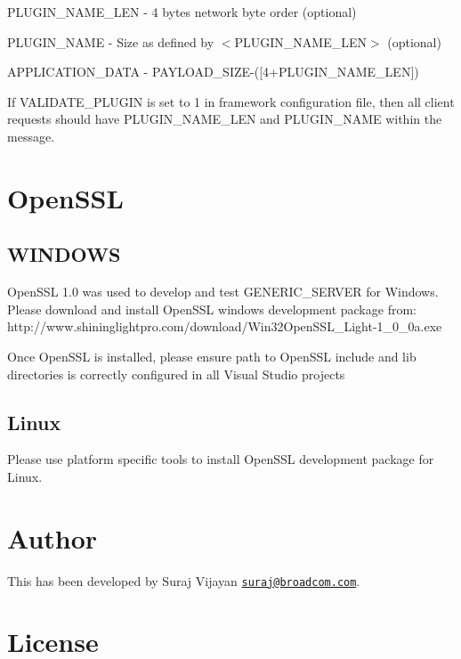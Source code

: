 \begin{DoxyItemize}
\item P\-L\-U\-G\-I\-N\-\_\-\-N\-A\-M\-E\-\_\-\-L\-E\-N -\/ 4 bytes network byte order (optional) \item P\-L\-U\-G\-I\-N\-\_\-\-N\-A\-M\-E -\/ Size as defined by $<$\-P\-L\-U\-G\-I\-N\-\_\-\-N\-A\-M\-E\-\_\-\-L\-E\-N$>$ (optional) \item A\-P\-P\-L\-I\-C\-A\-T\-I\-O\-N\-\_\-\-D\-A\-T\-A -\/ P\-A\-Y\-L\-O\-A\-D\-\_\-\-S\-I\-Z\-E-\/(\mbox{[}4+\-P\-L\-U\-G\-I\-N\-\_\-\-N\-A\-M\-E\-\_\-\-L\-E\-N\mbox{]})\end{DoxyItemize}
If V\-A\-L\-I\-D\-A\-T\-E\-\_\-\-P\-L\-U\-G\-I\-N is set to 1 in framework configuration file, then all client requests should have P\-L\-U\-G\-I\-N\-\_\-\-N\-A\-M\-E\-\_\-\-L\-E\-N and P\-L\-U\-G\-I\-N\-\_\-\-N\-A\-M\-E within the message.\hypertarget{index_ssl}{}\section{Open\-S\-S\-L}\label{index_ssl}
\hypertarget{index_sslwi}{}\subsection{W\-I\-N\-D\-O\-W\-S}\label{index_sslwi}
\begin{DoxyVerb}   OpenSSL 1.0 was used to develop and test GENERIC_SERVER for Windows. Please download and install
   OpenSSL windows development package from: 
   http://www.shininglightpro.com/download/Win32OpenSSL_Light-1_0_0a.exe
\end{DoxyVerb}
 Once Open\-S\-S\-L is installed, please ensure path to Open\-S\-S\-L include and lib directories is correctly configured in all Visual Studio projects \hypertarget{index_sslli}{}\subsection{Linux}\label{index_sslli}
\begin{DoxyVerb}   Please use platform specific tools to install OpenSSL development package for Linux.
\end{DoxyVerb}
\hypertarget{index_au}{}\section{Author}\label{index_au}
This has been developed by  Suraj Vijayan \href{mailto:suraj@broadcom.com}{\tt suraj@broadcom.\-com}.\hypertarget{index_li}{}\section{License}\label{index_li}

